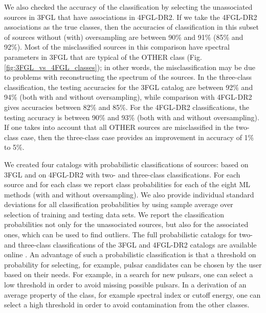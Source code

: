 \documentclass[referee]{aa} %
\begin{document}
We also checked the accuracy of the classification by selecting the unassociated sources in 3FGL that have associations in 4FGL-DR2.
If we take the 4FGL-DR2 associations as the true classes, then the accuracies of classification in this subset of sources 
without (with) oversampling are between 90\% and 91\% (85\% and 92\%).
Most of the misclassified sources in this comparison have spectral parameters in 3FGL that are typical of the OTHER class (Fig. \ref{fig:3FGL_vs_4FGL_classes}); in other words, the misclassification may be due to problems with reconstructing the spectrum of the sources.
In the three-class classification, the testing accuracies for the 3FGL catalog are between 92\% and 94\% (both with and without oversampling), while comparison with 4FGL-DR2 gives accuracies between 82\% and 85\%. For the 4FGL-DR2 classifications, the testing accuracy is between 90\% and 93\% (both with and without oversampling). If one takes into account that all OTHER sources are misclassified in the two-class case, then the three-class case provides an improvement in accuracy of 1\% to 5\%.

We created four catalogs with probabilistic classifications of sources: based on 3FGL and on 4FGL-DR2 with two- and three-class classifications.
For each source and for each class we report class probabilities for each of the eight ML methods (with and without oversampling). 
We also provide individual standard deviations for all classification probabilities by using sample average over selection of training and testing data sets.
We report the classification probabilities not only for the unassociated sources, but also for the associated ones, which can be used to find outliers.
The full probabilistic catalogs for two- and three-class classifications of the 3FGL and 4FGL-DR2 catalogs are available online \citep{SOM_material}.
An advantage of such a probabilistic classification is that a threshold on probability for selecting, for example, pulsar candidates can be chosen by the user based on their needs.
For example, in a search for new pulsars, one can select a low threshold in order to avoid missing possible pulsars.
In a derivation of an average property of the class, for example spectral index or cutoff energy, one can select a high threshold in order to avoid contamination from the other classes.
\end{document}
